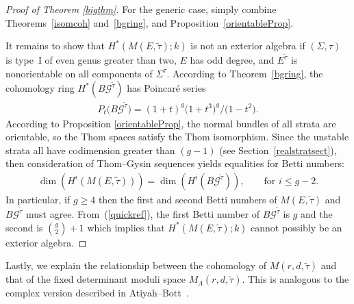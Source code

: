 \documentclass[pdftex]{sigma}
\numberwithin{equation}{section}
\begin{document}
\begin{proof}[Proof of Theorem \ref{bigthm}]
For the generic case, simply combine Theorems~\ref{isomcoh} and~\ref{bgring}, and Proposition~\ref{orientableProp}.

It remains to show that $H^*(M(E,\tilde{\tau});k)$ is not an exterior algebra if $(\Sigma,\tau)$ is type~I of even genus greater than two, $E$ has odd degree, and $E^{\tilde{\tau}}$ is nonorientable on all components of $\Sigma^{\tau}$. According to Theorem~\ref{bgring}, the cohomology ring $H^*(B{\mathcal G}^{\tilde{\tau}})$ has Poincar\'e series
\begin{gather}\label{quickref}
P_t\big(B{\mathcal G}^{\tilde{\tau}}\big) = (1+t)^g\big(1+t^3\big)^g/\big(1-t^2\big).
\end{gather} According to Proposition \ref{orientableProp}, the normal bundles of all strata are orientable, so the Thom spaces satisfy the Thom isomorphism. Since the unstable strata all have codimension greater than $(g-1)$ (see Section~\ref{realstratsect}), then consideration of Thom--Gysin sequences yields equalities for Betti numbers:
\begin{gather*}\dim(H^i(M(E,\tilde{\tau}))) = \dim(H^i( B{\mathcal G}^{\tilde{\tau}})),\qquad \text{for $i\leq g-2$}.\end{gather*}
In particular, if $g\geq 4$ then the f\/irst and second Betti numbers of $M(E,\tilde{\tau})$ and $B{\mathcal G}^{\tilde{\tau}}$ must agree. From~(\ref{quickref}), the f\/irst Betti number of $B{\mathcal G}^{\tilde{\tau}}$ is $g$ and the second is ${ g \choose 2}+1$ which implies that $H^*(M(E,\tilde{\tau});k)$ cannot possibly be an exterior algebra.
\end{proof}

Lastly, we explain the relationship between the cohomology of $M(r,d,\tilde{\tau})$ and that of the f\/ixed determinant moduli space $M_{\Lambda}(r,d,\tilde{\tau})$. This is analogous to the complex version described in Atiyah--Bott~\cite[p.~578]{AB}.
\end{document}
